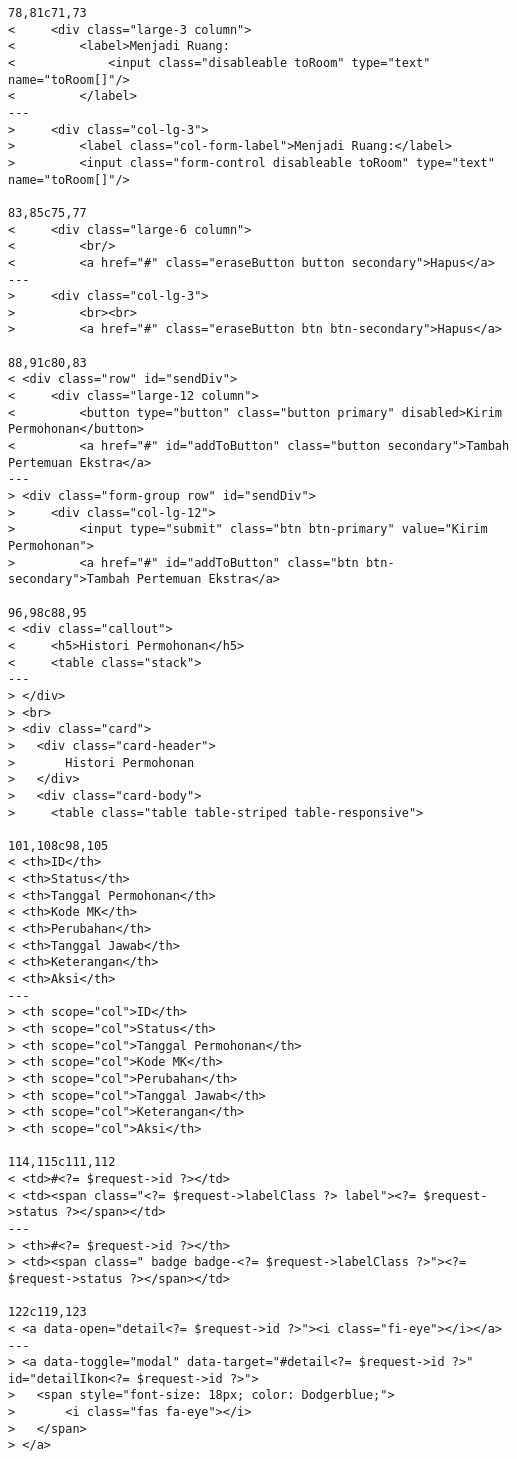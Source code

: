 \begin{lstlisting}
78,81c71,73
<     <div class="large-3 column">
<         <label>Menjadi Ruang:
<             <input class="disableable toRoom" type="text" name="toRoom[]"/>
<         </label>
---
>     <div class="col-lg-3">
>         <label class="col-form-label">Menjadi Ruang:</label>
>         <input class="form-control disableable toRoom" type="text" name="toRoom[]"/>

83,85c75,77
<     <div class="large-6 column">
<         <br/>
<         <a href="#" class="eraseButton button secondary">Hapus</a>
---
>     <div class="col-lg-3">
>         <br><br>
>         <a href="#" class="eraseButton btn btn-secondary">Hapus</a>

88,91c80,83
< <div class="row" id="sendDiv">
<     <div class="large-12 column">
<         <button type="button" class="button primary" disabled>Kirim Permohonan</button>
<         <a href="#" id="addToButton" class="button secondary">Tambah Pertemuan Ekstra</a>
---
> <div class="form-group row" id="sendDiv">
>     <div class="col-lg-12">
>         <input type="submit" class="btn btn-primary" value="Kirim Permohonan">
>         <a href="#" id="addToButton" class="btn btn-secondary">Tambah Pertemuan Ekstra</a>

96,98c88,95
< <div class="callout">
<     <h5>Histori Permohonan</h5>
<     <table class="stack">
---
> </div>
> <br>
> <div class="card">
>   <div class="card-header">
>       Histori Permohonan
>   </div>
>   <div class="card-body">
>     <table class="table table-striped table-responsive">

101,108c98,105
< <th>ID</th>
< <th>Status</th>
< <th>Tanggal Permohonan</th>
< <th>Kode MK</th>
< <th>Perubahan</th>
< <th>Tanggal Jawab</th>
< <th>Keterangan</th>
< <th>Aksi</th>
---
> <th scope="col">ID</th>
> <th scope="col">Status</th>
> <th scope="col">Tanggal Permohonan</th>
> <th scope="col">Kode MK</th>
> <th scope="col">Perubahan</th>
> <th scope="col">Tanggal Jawab</th>
> <th scope="col">Keterangan</th>
> <th scope="col">Aksi</th>

114,115c111,112
< <td>#<?= $request->id ?></td>
< <td><span class="<?= $request->labelClass ?> label"><?= $request->status ?></span></td>
---
> <th>#<?= $request->id ?></th>
> <td><span class=" badge badge-<?= $request->labelClass ?>"><?= $request->status ?></span></td>

122c119,123
< <a data-open="detail<?= $request->id ?>"><i class="fi-eye"></i></a>
---
> <a data-toggle="modal" data-target="#detail<?= $request->id ?>" id="detailIkon<?= $request->id ?>">
>   <span style="font-size: 18px; color: Dodgerblue;">
>       <i class="fas fa-eye"></i>
>   </span>
> </a>


\end{lstlisting}
